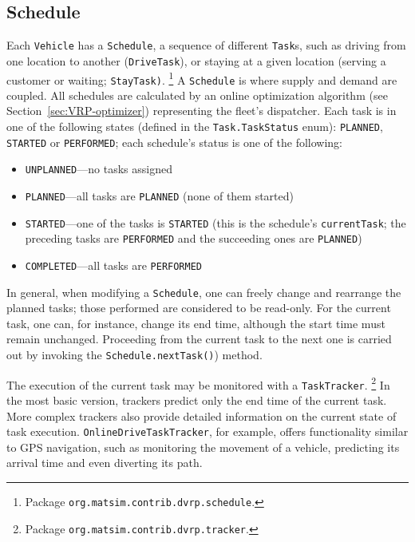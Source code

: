 \subsection{Schedule}
\label{sec:VRP-schedule}
Each \lstinline$Vehicle$ has a \lstinline$Schedule$, a sequence of different \lstinline$Task$s, such as driving from one location to another (\lstinline$DriveTask$), or staying at a given location (\eg serving a customer or waiting;  \lstinline$StayTask)$.%
\footnote{
Package \lstinline$org.matsim.contrib.dvrp.schedule$.
}
A \lstinline$Schedule$ is where supply and demand are coupled. All schedules are calculated by an online optimization algorithm (see Section~\ref{sec:VRP-optimizer}) representing the fleet's dispatcher. Each task is in one of the following states (defined in the \lstinline$Task.TaskStatus$ enum): \lstinline$PLANNED$, \lstinline$STARTED$ or \lstinline$PERFORMED$; each schedule's status is one of the following:
%
\begin{itemize}
	\item \lstinline$UNPLANNED$---no tasks assigned
	
	\item \lstinline$PLANNED$---all tasks are \lstinline$PLANNED$ (none of them started)
	
	\item \lstinline$STARTED$---one of the tasks is \lstinline$STARTED$ (this is the schedule's \lstinline$currentTask$; the preceding tasks are \lstinline$PERFORMED$ and the succeeding ones are \lstinline$PLANNED$)
	
	\item \lstinline$COMPLETED$---all tasks are \lstinline$PERFORMED$
\end{itemize}
%
In general, when modifying a \lstinline$Schedule$, one can freely change and rearrange the planned tasks; those performed are considered to be read-only. For the current task, one can, for instance, change its end time, although the start time must remain unchanged. Proceeding from the current task to the next one is carried out by invoking the \lstinline$Schedule.nextTask()$) method.

The execution of the current task may be monitored with a \lstinline$TaskTracker$.%
\footnote{
Package \lstinline$org.matsim.contrib.dvrp.tracker$.
}
In the most basic version, trackers predict only the end time of the current task. More complex trackers also provide detailed information on the current state of task execution. \lstinline$OnlineDriveTaskTracker$, for example, offers functionality similar to GPS navigation, such as monitoring the movement of a vehicle, predicting its arrival time and even diverting its path.

